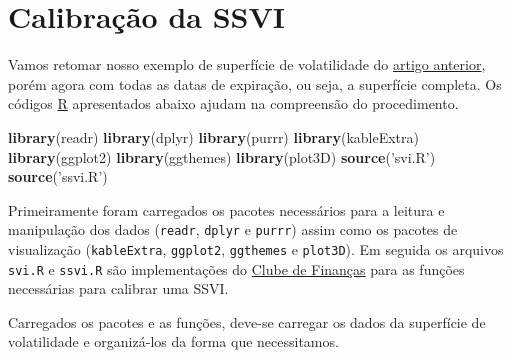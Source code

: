 \documentclass[]{book}
\newenvironment{Shaded}{\begin{snugshade}}{\end{snugshade}}
\newcommand{\KeywordTok}[1]{\textcolor[rgb]{0.13,0.29,0.53}{\textbf{#1}}}
\newcommand{\DataTypeTok}[1]{\textcolor[rgb]{0.13,0.29,0.53}{#1}}
\newcommand{\DecValTok}[1]{\textcolor[rgb]{0.00,0.00,0.81}{#1}}
\newcommand{\StringTok}[1]{\textcolor[rgb]{0.31,0.60,0.02}{#1}}
\newcommand{\OperatorTok}[1]{\textcolor[rgb]{0.81,0.36,0.00}{\textbf{#1}}}
\newcommand{\NormalTok}[1]{#1}
\theoremstyle{definition}
\theoremstyle{definition}
\theoremstyle{definition}
\theoremstyle{remark}
\begin{document}
\section{Calibração da SSVI}\label{calibracao-da-ssvi}

Vamos retomar nosso exemplo de superfície de volatilidade do
\protect\hyperlink{svi}{artigo anterior}, porém agora com todas as datas
de expiração, ou seja, a superfície completa. Os códigos
\href{https://cran.r-project.org/}{R} apresentados abaixo ajudam na
compreensão do procedimento.

\begin{Shaded}
\begin{Highlighting}[]
\KeywordTok{library}\NormalTok{(readr)}
\KeywordTok{library}\NormalTok{(dplyr)}
\KeywordTok{library}\NormalTok{(purrr)}
\KeywordTok{library}\NormalTok{(kableExtra)}
\KeywordTok{library}\NormalTok{(ggplot2)}
\KeywordTok{library}\NormalTok{(ggthemes)}
\KeywordTok{library}\NormalTok{(plot3D)}
\KeywordTok{source}\NormalTok{(}\StringTok{'svi.R'}\NormalTok{)}
\KeywordTok{source}\NormalTok{(}\StringTok{'ssvi.R'}\NormalTok{)}
\end{Highlighting}
\end{Shaded}

Primeiramente foram carregados os pacotes necessários para a leitura e
manipulação dos dados (\texttt{readr}, \texttt{dplyr} e \texttt{purrr})
assim como os pacotes de visualização (\texttt{kableExtra},
\texttt{ggplot2}, \texttt{ggthemes} e \texttt{plot3D}). Em seguida os
arquivos \texttt{svi.R} e \texttt{ssvi.R} são implementações do
\href{http://clubedefinancas.com.br/}{Clube de Finanças} para as funções
necessárias para calibrar uma SSVI.

Carregados os pacotes e as funções, deve-se carregar os dados da
superfície de volatilidade e organizá-los da forma que necessitamos.

\begin{Shaded}
\end{Shaded}
\end{document}
